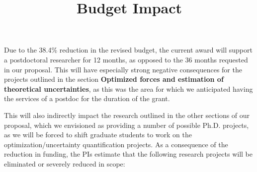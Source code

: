 \documentclass[12pt]{article}
\title{Budget Impact}
\date{} %
\begin{document}
\maketitle
Due to the 38.4\% reduction in the revised budget, the current award will support a postdoctoral researcher for 12 months, as opposed to the 36 months requested in our proposal.  This will have especially strong negative consequences for the projects outlined in the section {\bf Optimized forces and estimation of theoretical uncertainties}, as this was the area for which we anticipated having the services of a postdoc for the duration of the grant.  

This will also indirectly impact the research outlined in the other sections of our proposal, which we envisioned as providing a number of possible Ph.D. projects, as we will be forced to shift graduate students to work on the optimization/uncertainty quantification projects.  As a consequence of the reduction in funding, the PIs estimate that the following research projects will be eliminated or severely reduced in scope:
\end{document}
